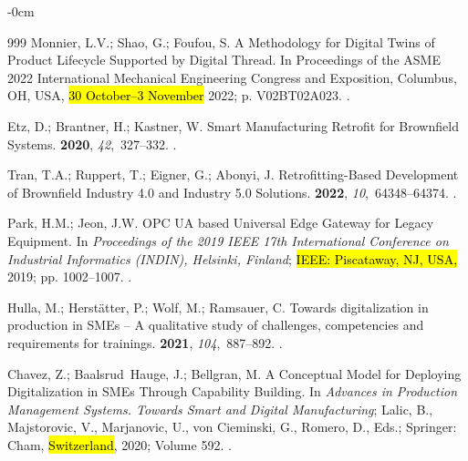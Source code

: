 \documentclass[systems,article,accept,pdftex,moreauthors]{Definitions/mdpi}
\begin{document}
\begin{adjustwidth}{-\extralength}{0cm}
\begin{thebibliography}{999}
Monnier, L.V.; Shao, G.; Foufou, S.
\newblock A Methodology for Digital Twins of Product Lifecycle Supported by
  Digital Thread.
\newblock In Proceedings of the ASME 2022 International Mechanical Engineering
  Congress and Exposition, Columbus, OH, USA, \hl{30 October--3 November} %
 2022; p. V02BT02A023.
.

Etz, D.; Brantner, H.; Kastner, W.
\newblock Smart Manufacturing Retrofit for Brownfield Systems.
 {\bf 2020}, {\em 42},~327--332.
.

Tran, T.A.; Ruppert, T.; Eigner, G.; Abonyi, J.
\newblock Retrofitting-Based Development of Brownfield Industry 4.0 and
  Industry 5.0 Solutions.
 {\bf 2022}, {\em 10},~64348--64374.
.

Park, H.M.; Jeon, J.W.
\newblock OPC UA based Universal Edge Gateway for Legacy Equipment.
\newblock In \textit{Proceedings of the 2019 IEEE 17th International Conference on
  Industrial Informatics (INDIN), Helsinki, Finland}; \hl{IEEE: Piscataway, NJ, USA,} %
  2019; pp. 1002--1007.
.

Hulla, M.; Herst{\"a}tter, P.; Wolf, M.; Ramsauer, C.
\newblock Towards digitalization in production in SMEs -- A qualitative study
  of challenges, competencies and requirements for trainings.
 {\bf 2021}, {\em 104},~887--892.
.

Chavez, Z.; Baalsrud~Hauge, J.; Bellgran, M.
\newblock A Conceptual Model for Deploying Digitalization in SMEs Through
  Capability Building. In {\em Advances in Production Management Systems.
  Towards Smart and Digital Manufacturing}; Lalic, B., Majstorovic, V.,
  Marjanovic, U., von Cieminski, G., Romero, D., Eds.; Springer: Cham,  \hl{Switzerland}, 2020;
  Volume 592. %
\newblock {}.%


\end{thebibliography}
\end{adjustwidth}
\end{document}
